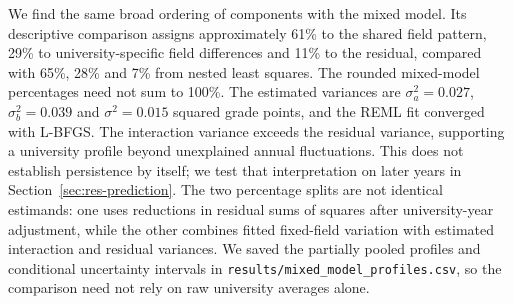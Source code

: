 We find the same broad ordering of components with the mixed model. Its descriptive comparison assigns approximately 61\% to the shared field pattern, 29\% to university-specific field differences and 11\% to the residual, compared with 65\%, 28\% and 7\% from nested least squares. The rounded mixed-model percentages need not sum to 100\%. The estimated variances are $\sigma_a^2=0.027$, $\sigma_b^2=0.039$ and $\sigma^2=0.015$ squared grade points, and the REML fit converged with L-BFGS. The interaction variance exceeds the residual variance, supporting a university profile beyond unexplained annual fluctuations. This does not establish persistence by itself; we test that interpretation on later years in Section~\ref{sec:res-prediction}. The two percentage splits are not identical estimands: one uses reductions in residual sums of squares after university-year adjustment, while the other combines fitted fixed-field variation with estimated interaction and residual variances. We saved the partially pooled profiles and conditional uncertainty intervals in \texttt{results/mixed\_model\_profiles.csv}, so the comparison need not rely on raw university averages alone.
